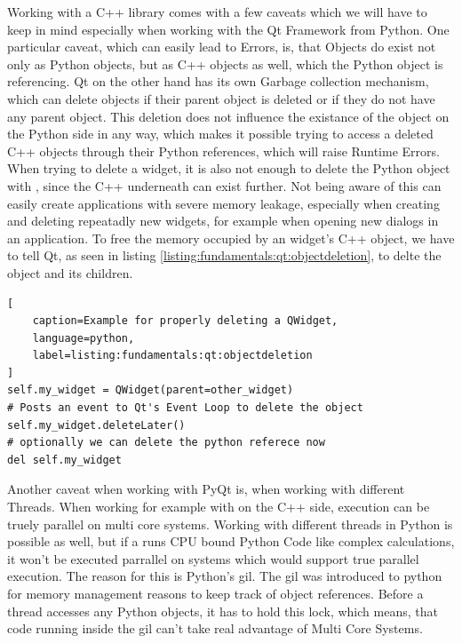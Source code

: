 Working with a C++ library comes with a few caveats which we will have to keep
in mind especially when working with the Qt Framework from Python. One
particular caveat, which can easily lead to Errors, is, that Objects do exist
not only as Python objects, but as C++ objects as well, which the Python object
is referencing. Qt on the other hand has its own Garbage collection mechanism,
which can delete objects if their parent object is deleted or if they do not
have any parent object. This deletion does not influence the existance of the
object on the Python side in any way, which makes it possible trying to access a
deleted C++ objects through their Python references, which will raise Runtime
Errors. When trying to delete a widget, it is also not enough to delete the
Python object with , since the C++
underneath can exist further. Not being aware of this can easily create
applications with severe memory leakage, especially when creating and deleting
repeatadly new widgets, for example when opening new dialogs in an application.
To free the memory occupied by an widget's C++ object, we have to tell Qt, as
seen in listing \ref{listing:fundamentals:qt:objectdeletion}, to delte the
object and its children.

\begin{lstlisting}[
    caption=Example for properly deleting a QWidget,
    language=python, 
    label=listing:fundamentals:qt:objectdeletion
]
self.my_widget = QWidget(parent=other_widget)
# Posts an event to Qt's Event Loop to delete the object
self.my_widget.deleteLater()
# optionally we can delete the python referece now
del self.my_widget
\end{lstlisting}

Another caveat when working with PyQt is, when working with different Threads.
When working for example with  on the C++
side, execution can be truely parallel on multi core systems. Working with
different threads in Python is possible as well, but if a
 runs CPU bound Python Code like complex
calculations, it won't be executed parrallel on systems which would support true
parallel execution. The reason for this is Python's \gls{gil}. The \gls{gil} was
introduced to python for memory management reasons to keep track of object
references. Before a thread accesses any Python objects, it has to hold this
lock, which means, that code running inside the \gls{gil} can't take real
advantage of Multi Core Systems.

